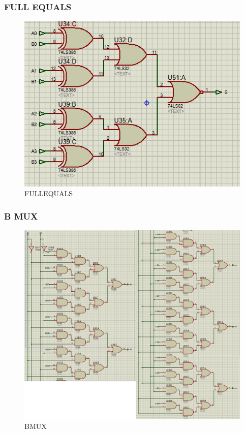 \documentclass{article}
\begin{document}
\subsubsection{FULL EQUALS}
\begin{figure}[!h]
    \centering
    \includegraphics[scale =0.75]{FULLEQUALS.PNG}
    \caption{FULLEQUALS}
    \label{fig:FULLEQUALS}
\end{figure}
\newpage
\subsubsection{B MUX}
\begin{figure}[!h]
    \centering
    \includegraphics[scale =0.4]{BMUX.PNG}
    \caption{BMUX}
    \label{fig:BMUX}
\end{figure}
\newpage
\end{document}
